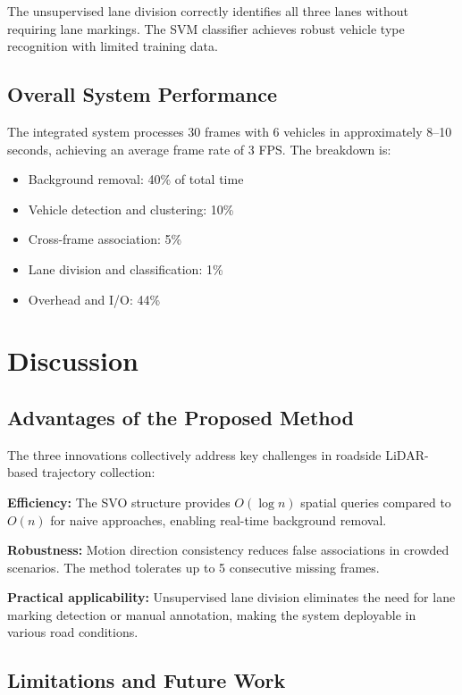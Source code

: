 \documentclass[numbered]{trbunofficial}
\begin{document}
The unsupervised lane division correctly identifies all three lanes without requiring lane markings. The SVM classifier achieves robust vehicle type recognition with limited training data.

\subsection{Overall System Performance}

The integrated system processes 30 frames with 6 vehicles in approximately 8--10 seconds, achieving an average frame rate of 3 FPS. The breakdown is:
\begin{itemize}
  \item Background removal: 40\% of total time
  \item Vehicle detection and clustering: 10\%
  \item Cross-frame association: 5\%
  \item Lane division and classification: 1\%
  \item Overhead and I/O: 44\%
\end{itemize}


\section{Discussion}

\subsection{Advantages of the Proposed Method}

The three innovations collectively address key challenges in roadside LiDAR-based trajectory collection:

\textbf{Efficiency:} The SVO structure provides $O(\log n)$ spatial queries compared to $O(n)$ for naive approaches, enabling real-time background removal.

\textbf{Robustness:} Motion direction consistency reduces false associations in crowded scenarios. The method tolerates up to 5 consecutive missing frames.

\textbf{Practical applicability:} Unsupervised lane division eliminates the need for lane marking detection or manual annotation, making the system deployable in various road conditions.

\subsection{Limitations and Future Work}
\end{document}
